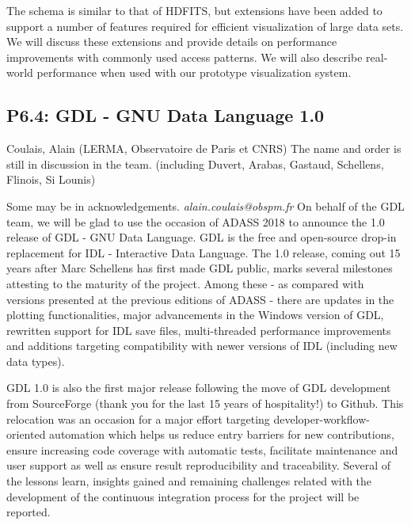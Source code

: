 \documentclass{report}
\begin{document}
The schema is similar to that of HDFITS, but extensions have been added to support a number of features required for efficient visualization of large data sets. We will discuss these extensions and provide details on performance improvements with commonly used access patterns. We will also describe real-world performance when used with our prototype visualization system.\newline
\newpage
\subsection*{P6.4: GDL - GNU Data Language 1.0}
\bigskip
Coulais, Alain (LERMA, Observatoire de Paris et CNRS) \newline   \newline   \newline   \newline  \newline  The name and order is still in discussion in the team.
(including Duvert, Arabas, Gastaud, Schellens, Flinois, Si Lounis)

Some may be in acknowledgements.\newline\newline
{\it alain.coulais@obspm.fr}\newline
\newline\newline
On behalf of the GDL team, we will be glad to use the occasion of ADASS 
2018 to announce the 1.0 release of GDL - GNU Data Language. GDL is the 
free and open-source drop-in replacement for IDL - Interactive Data 
Language. The 1.0 release, coming out 15 years after Marc Schellens has 
first made GDL public, marks several milestones attesting to the 
maturity of the project. Among these - as compared with versions 
presented at the previous editions of ADASS - there are updates in the 
plotting functionalities, major advancements in the Windows version of 
GDL, rewritten support for IDL save files, multi-threaded performance 
improvements and additions targeting compatibility with newer versions 
of IDL (including new data types).

GDL 1.0 is also the first major release following the move of GDL 
development from SourceForge (thank you for the last 15 years of 
hospitality!) to Github. This relocation was an occasion for a major 
effort targeting developer-workflow-oriented automation which helps us 
reduce entry barriers for new contributions, ensure increasing code 
coverage with automatic tests, facilitate maintenance and user support 
as well as ensure result reproducibility and traceability. Several of 
the lessons learn, insights gained and remaining challenges related 
with the development of the continuous integration process for the 
project will be reported.
\end{document}
